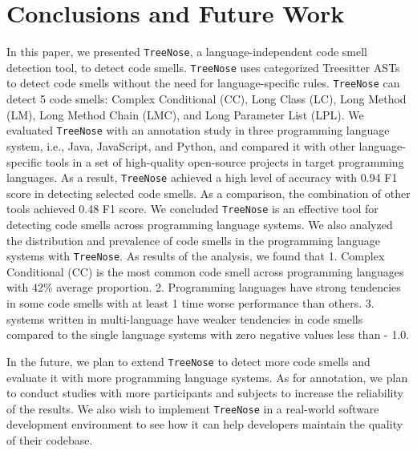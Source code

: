 \section{Conclusions and Future Work}
\label{sec:conclusions-and-future-work}

In this paper, we presented \texttt{TreeNose}, a language-independent code smell detection tool, to detect code smells.
\texttt{TreeNose} uses categorized Treesitter ASTs to detect code smells without the need for language-specific rules.
\texttt{TreeNose} can detect 5 code smells: Complex Conditional (CC), Long Class (LC), Long Method (LM), Long Method Chain (LMC), and Long Parameter List (LPL).
We evaluated \texttt{TreeNose} with an annotation study in three programming language system, i.e., Java, JavaScript, and Python,
and compared it with other language-specific tools in a set of high-quality open-source projects in target programming languages. 
As a result, \texttt{TreeNose} achieved a high level of accuracy with 0.94 F1 score in detecting selected code smells. As a comparison, the combination of other tools achieved 0.48 F1 score.
We concluded \texttt{TreeNose} is an effective tool for detecting code smells across programming language systems.
We also analyzed the distribution and prevalence of code smells in the programming language systems with \texttt{TreeNose}. As results of the analysis, we found that
1. Complex Conditional (CC) is the most common code smell across programming languages with 42\% average proportion.
2. Programming languages have strong tendencies in some code smells with at least 1 time worse performance than others.
3. systems written in multi-language have weaker tendencies in code smells compared to the single language systems with zero negative values less than - 1.0.

In the future, we plan to extend \texttt{TreeNose} to detect more code smells and evaluate it with more programming language systems. As for annotation,
we plan to conduct studies with more participants and subjects to increase the reliability of the results.
We also wish to implement \texttt{TreeNose} in a real-world software development environment to see how it can help developers maintain the quality of their codebase.